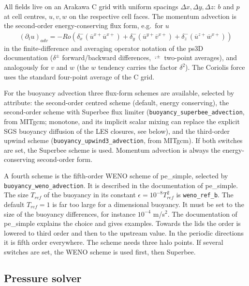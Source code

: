 \documentclass[12pt]{article}
\newcommand{\beq}  { \begin{eqnarray*} }
\newcommand{\eeq}  { \end{eqnarray*}}
\newcommand{\pt}[1]{{\partial_t #1}}
\newcommand{\lk}{\left(}
\newcommand{\rk}{\right)}
\newcommand{\Bar}[1]{ \overline{ #1} }
\begin{document}
All fields live on an Arakawa C grid with uniform spacings
$\Delta x, \Delta y, \Delta z$: $b$ and $p$ at cell centres, $u,v,w$ on the
respective cell faces. The momentum advection is the second-order
energy-conserving flux form, e.g.\ for $u$
\beq
 \lk \pt u \rk_{adv} = -Ro \lk \delta_x^- \lk \Bar u^{x+} \Bar u^{x+} \rk
 + \delta_y^- \lk \Bar u^{y+} \Bar v^{x+} \rk
 + \delta_z^- \lk \Bar u^{z+} \Bar w^{x+} \rk \rk
\eeq
in the finite-difference and averaging operator notation of the ps3D
documentation ($\delta^\pm$ forward/backward differences, $\Bar{\cdot}^\pm$
two-point averages), and analogously for $v$ and $w$ (the $w$ tendency
carries the factor $\delta^2$). The Coriolis force uses the standard
four-point average of the C grid.

For the buoyancy advection three flux-form schemes are available, selected
by attribute: the second-order centred scheme (default, energy conserving),
the second-order scheme with Superbee flux limiter
(\verb|buoyancy_superbee_advection|, from MITgcm; monotone, and its
implicit scalar mixing can replace the explicit SGS buoyancy diffusion of
the LES closures, see below), and the third-order upwind scheme
(\verb|buoyancy_upwind3_advection|, from MITgcm). If both switches are
set, the Superbee scheme is used. Momentum advection is
always the energy-conserving second-order form.

A fourth scheme is the fifth-order WENO scheme of pe\_simple, selected by \verb|buoyancy_weno_advection|.
It is described in the documentation of pe\_simple.
The size $T_{ref}$ of the buoyancy in its constant $\epsilon = 10^{-8} T_{ref}^2$ is \verb|weno_ref_b|.
The default $T_{ref} = 1$ is far too large for a dimensional buoyancy.
It must be set to the size of the buoyancy differences, for instance $10^{-4}$ m/s$^2$.
The documentation of pe\_simple explains the choice and gives examples.
Towards the lids the order is lowered to third order and then to the upstream value.
In the periodic directions it is fifth order everywhere.
The scheme needs three halo points.
If several switches are set, the WENO scheme is used first, then Superbee.

\subsection*{Pressure solver}
\end{document}
